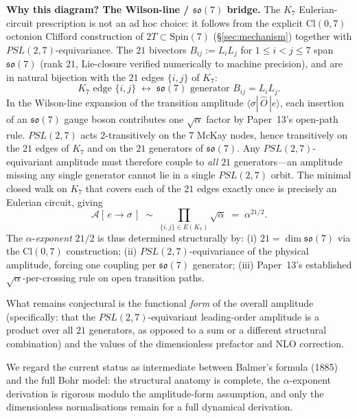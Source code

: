 \documentclass[11pt]{article}
\begin{document}
\medskip
\noindent\textbf{Why this diagram?  The Wilson-line / $\mathfrak{so}(7)$
bridge.}
The $K_7$ Eulerian-circuit prescription is not an ad hoc choice:
it follows from the explicit $\mathrm{Cl}(0, 7)$ octonion Clifford
construction of $2T \subset \mathrm{Spin}(7)$ (\S\ref{sec:mechanism})
together with $PSL(2, 7)$-equivariance.  The $21$ bivectors
$B_{ij} := L_i L_j$ for $1 \leq i < j \leq 7$ span
$\mathfrak{so}(7)$ (rank $21$, Lie-closure verified numerically to
machine precision), and are in natural bijection with the $21$
edges $\{i, j\}$ of $K_7$:
\begin{equation}
  \text{$K_7$ edge $\{i, j\}$}
  \;\longleftrightarrow\;
  \text{$\mathfrak{so}(7)$ generator } B_{ij} = L_i L_j .
\end{equation}
In the Wilson-line expansion of the transition amplitude
$\langle\sigma |\, \hat{O} \, | e\rangle$, each insertion of an
$\mathfrak{so}(7)$ gauge boson contributes one $\sqrt{\alpha}$
factor by Paper~13's open-path rule.  $PSL(2,7)$ acts
$2$-transitively on the $7$ McKay nodes, hence transitively on
the $21$ edges of $K_7$ and on the $21$ generators of
$\mathfrak{so}(7)$.  Any $PSL(2,7)$-equivariant amplitude must
therefore couple to \emph{all} $21$ generators---an amplitude
missing any single generator cannot lie in a single $PSL(2, 7)$
orbit.  The minimal closed walk on $K_7$ that covers each of
the $21$ edges exactly once is precisely an Eulerian circuit,
giving
\begin{equation}
  \mathcal{A}[\,e \to \sigma\,]
  \;\sim\;
  \prod_{\{i, j\} \in E(K_7)} \sqrt{\alpha}
  \;=\; \alpha^{21/2} .
\end{equation}
The $\alpha$-\emph{exponent} $21/2$ is thus determined
structurally by:
(i) $21 = \dim \mathfrak{so}(7)$ via the $\mathrm{Cl}(0, 7)$
construction;
(ii) $PSL(2, 7)$-equivariance of the physical amplitude, forcing
one coupling per $\mathfrak{so}(7)$ generator;
(iii) Paper~13's established $\sqrt{\alpha}$-per-crossing rule on
open transition paths.

What remains conjectural is the functional \emph{form} of the
overall amplitude (specifically: that the $PSL(2, 7)$-equivariant
leading-order amplitude is a product over all $21$ generators, as
opposed to a sum or a different structural combination) and the
values of the dimensionless prefactor and NLO correction.

We regard the current status as intermediate between Balmer's
formula (1885) and the full Bohr model: the structural anatomy
is complete, the $\alpha$-exponent derivation is rigorous modulo
the amplitude-form assumption, and only the dimensionless
normalisations remain for a full dynamical derivation.
\end{document}
